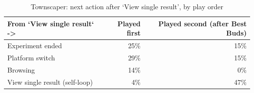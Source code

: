 \begin{table}[t]
\centering
\caption{Townscaper: next action after `View single result', by play order}
\label{tab:rq6-closing-move-by-order}
\begin{tabular}{lrr}
\toprule
From `View single result` -> & Played first & Played second (after Best Buds) \\
\midrule
Experiment ended & 25\% & 15\% \\
Platform switch & 29\% & 15\% \\
Browsing & 14\% & 0\% \\
View single result (self-loop) & 4\% & 47\% \\
\bottomrule
\end{tabular}
\end{table}
